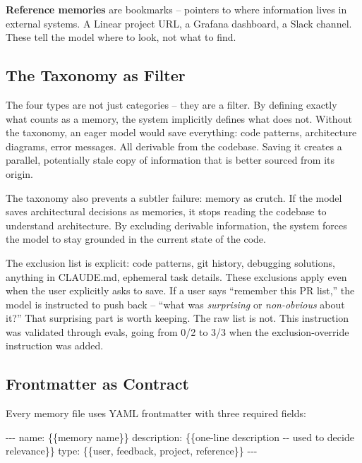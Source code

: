 \documentclass[
  english,
  11pt,
  letterpaper,
]{book}
\newenvironment{Shaded}{\begin{snugshade}}{\end{snugshade}}
\newcommand{\AnnotationTok}[1]{\textcolor[rgb]{0.37,0.37,0.37}{#1}}
\newcommand{\CommentTok}[1]{\textcolor[rgb]{0.37,0.37,0.37}{#1}}
\begin{document}
\textbf{Reference memories} are bookmarks -- pointers to where
information lives in external systems. A Linear project URL, a Grafana
dashboard, a Slack channel. These tell the model where to look, not what
to find.

\subsection{The Taxonomy as Filter}\label{the-taxonomy-as-filter}

The four types are not just categories -- they are a filter. By defining
exactly what counts as a memory, the system implicitly defines what does
not. Without the taxonomy, an eager model would save everything: code
patterns, architecture diagrams, error messages. All derivable from the
codebase. Saving it creates a parallel, potentially stale copy of
information that is better sourced from its origin.

The taxonomy also prevents a subtler failure: memory as crutch. If the
model saves architectural decisions as memories, it stops reading the
codebase to understand architecture. By excluding derivable information,
the system forces the model to stay grounded in the current state of the
code.

The exclusion list is explicit: code patterns, git history, debugging
solutions, anything in CLAUDE.md, ephemeral task details. These
exclusions apply even when the user explicitly asks to save. If a user
says ``remember this PR list,'' the model is instructed to push back --
``what was \emph{surprising} or \emph{non-obvious} about it?'' That
surprising part is worth keeping. The raw list is not. This instruction
was validated through evals, going from 0/2 to 3/3 when the
exclusion-override instruction was added.

\subsection{Frontmatter as Contract}\label{frontmatter-as-contract}

Every memory file uses YAML frontmatter with three required fields:

\begin{Shaded}
\begin{Highlighting}[]
\CommentTok{{-}{-}{-}}
\AnnotationTok{name:}\CommentTok{ \{\{memory name\}\}}
\AnnotationTok{description:}\CommentTok{ \{\{one{-}line description {-}{-} used to decide relevance\}\}}
\AnnotationTok{type:}\CommentTok{ \{\{user, feedback, project, reference\}\}}
\CommentTok{{-}{-}{-}}
\end{Highlighting}
\end{Shaded}
\end{document}
